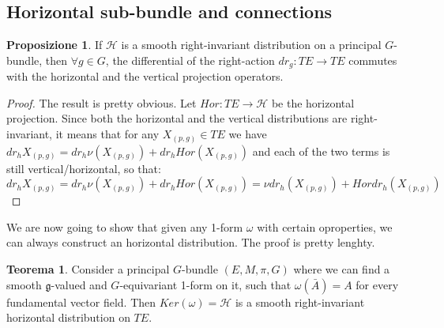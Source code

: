\documentclass[12pt,a4paper]{report}
\theoremstyle{definition}
\theoremstyle{Theorem}
\newtheorem{Theo}[Def]{Teorema}
\newtheorem{Prop}[Def]{Proposizione}
\theoremstyle{definition}
\theoremstyle{definition}
\theoremstyle{definition}
\begin{document}
	\subsection{Horizontal sub-bundle and connections}
	\begin{Prop}
		If $\mathcal{H}$ is a smooth right-invariant distribution on a principal $G$-bundle, then $\forall g\in G$, the differential of the right-action $dr_g:TE\rightarrow TE$ commutes with the horizontal and the vertical projection operators.
	\end{Prop}
	\begin{proof}
		The result is pretty obvious. Let $Hor:TE\rightarrow\mathcal{H}$ be the horizontal projection. Since both the horizontal and the vertical distributions are right-invariant, it means that for any $X_{(p,g)}\in TE$ we have $dr_h X_{(p,g)}=dr_h \nu(X_{(p,g)})+dr_hHor(X_{(p,g)})$ and each of the two terms is still vertical/horizontal, so that:
		$$dr_h X_{(p,g)}=dr_h \nu(X_{(p,g)})+dr_hHor(X_{(p,g)})=
		\nu dr_h(X_{(p,g)})+Hordr_h(X_{(p,g)})$$
	\end{proof}
	We are now going to show that given any 1-form $\omega$ with certain oproperties, we can always construct an horizontal distribution. The proof is pretty lenghty.
	\begin{Theo}
		Consider a principal $G$-bundle $(E,M,\pi,G)$ where we can find a smooth $\mathfrak{g}$-valued and $G$-equivariant 1-form on it, such that $\omega(\bar{A})=A$ for every fundamental vector field. Then $Ker(\omega)=\mathcal{H}$ is a smooth right-invariant horizontal distribution on $TE$.
	\end{Theo}
\end{document}
